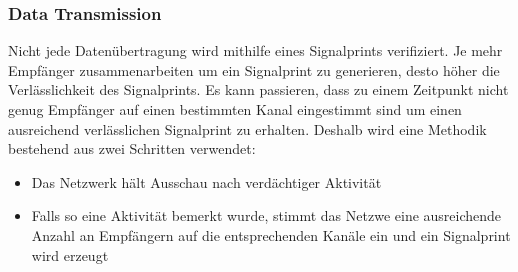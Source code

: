\documentclass[12pt,a4paper]{article}
\begin{document}
\subsubsection*{Data Transmission}
Nicht jede Datenübertragung wird mithilfe eines Signalprints 
verifiziert. Je mehr Empfänger zusammenarbeiten um ein 
Signalprint zu generieren, desto höher die Verlässlichkeit 
des Signalprints. Es kann passieren, dass zu einem Zeitpunkt 
nicht genug Empfänger auf einen bestimmten Kanal eingestimmt 
sind um einen ausreichend verlässlichen Signalprint zu erhalten. 
Deshalb wird eine Methodik bestehend aus zwei Schritten verwendet:
\begin{itemize}
	\item Das Netzwerk hält Ausschau nach verdächtiger Aktivität
	\item Falls so eine Aktivität bemerkt wurde, stimmt das Netzwe 
	eine ausreichende Anzahl an Empfängern auf die entsprechenden 
	Kanäle ein und ein Signalprint wird erzeugt
\end{itemize}

\end{document}
